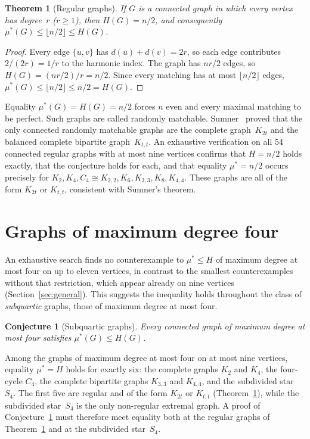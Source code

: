 \documentclass[11pt]{article}
\newtheorem{theorem}{Theorem}
\newtheorem{conjecture}{Conjecture}
\theoremstyle{definition}
\theoremstyle{remark}
\newcommand{\mustar}{\mu^{*}}
\begin{document}
\begin{theorem}[Regular graphs]\label{thm:regular}
If $G$ is a connected graph in which every vertex has degree~$r$
($r \ge 1$), then $H(G) = n/2$, and consequently
$\mustar(G) \le \lfloor n/2 \rfloor \le H(G)$.
\end{theorem}

\begin{proof}
Every edge $\{u,v\}$ has $d(u) + d(v) = 2r$, so each edge contributes
$2/(2r) = 1/r$ to the harmonic index.  The graph has $nr/2$ edges, so
$H(G) = (nr/2)/r = n/2$.  Since every matching has at most
$\lfloor n/2 \rfloor$ edges, $\mustar(G) \le \lfloor n/2 \rfloor \le n/2
= H(G)$.
\end{proof}

Equality $\mustar(G) = H(G) = n/2$ forces $n$ even and every maximal
matching to be perfect.  Such graphs are called randomly matchable.
Sumner~\cite{Sumner1979randomly} proved that the only connected randomly
matchable graphs are the complete graph~$K_{2t}$ and the balanced complete
bipartite graph~$K_{t,t}$.  An exhaustive verification on all 54 connected
regular graphs with at most nine vertices confirms that $H = n/2$ holds
exactly, that the conjecture holds for each, and that equality
$\mustar = n/2$ occurs precisely for $K_2, K_4, C_4 \cong K_{2,2}, K_6,
K_{3,3}, K_8, K_{4,4}$.  These graphs are all of the form $K_{2t}$ or
$K_{t,t}$, consistent with Sumner's theorem.

\section{Graphs of maximum degree four}\label{sec:subquartic}

An exhaustive search finds no counterexample to $\mustar \le H$ of maximum
degree at most four on up to eleven vertices, in contrast to the smallest
counterexamples without that restriction, which appear already on nine
vertices (Section~\ref{sec:general}).  This suggests the inequality holds throughout the
class of \emph{subquartic} graphs, those of maximum degree at most four.

\begin{conjecture}[Subquartic graphs]\label{conj:subquartic}
Every connected graph of maximum degree at most four satisfies
$\mustar(G) \le H(G)$.
\end{conjecture}

Among the graphs of maximum degree at most four on at most nine vertices,
equality $\mustar = H$ holds for exactly six: the complete graphs $K_2$ and
$K_4$, the four-cycle $C_4$, the complete bipartite graphs $K_{3,3}$ and
$K_{4,4}$, and the subdivided star~$S_4$.  The first five are regular and of the
form $K_{2t}$ or $K_{t,t}$ (Theorem~\ref{thm:regular}), while the subdivided
star~$S_4$ is the only non-regular extremal graph.  A proof of
Conjecture~\ref{conj:subquartic} must therefore meet equality both at the
regular graphs of Theorem~\ref{thm:regular} and at the subdivided star~$S_4$.
\end{document}
